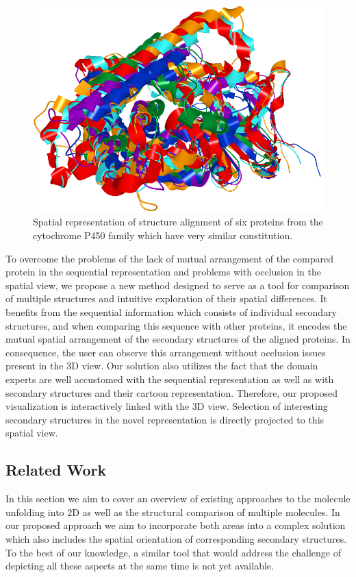 \documentclass[twocolumn]{bmcart}%
\begin{document}
\begin{figure}[h!]
  \centering
  \includegraphics[width=0.9\columnwidth]{pics/many.png}
  \caption{Spatial representation of structure alignment of six proteins from the cytochrome P450 family which have very similar constitution.}
  \label{fig:many}
\end{figure}

To overcome the problems of the lack of mutual arrangement of the compared protein in the sequential representation and problems with occlusion in the spatial view, we propose a new method designed to serve as a tool for comparison of multiple structures and intuitive exploration of their spatial differences.
It benefits from the sequential information which consists of individual secondary structures, and when comparing this sequence with other proteins, it encodes the mutual spatial arrangement of the secondary structures of the aligned proteins.
In consequence, the user can observe this arrangement without occlusion issues present in the 3D view.
Our solution also utilizes the fact that the domain experts are well accustomed with the sequential representation as well as with secondary structures and their cartoon representation. 
Therefore, our proposed visualization is interactively linked with the 3D view.
Selection of interesting secondary structures in the novel representation is directly projected to this spatial view. 


\subsection*{Related Work}
In this section we aim to cover an overview of existing approaches to the molecule unfolding into 2D as well as the structural comparison of multiple molecules.
In our proposed approach we aim to incorporate both areas into a complex solution which also includes the spatial orientation of corresponding secondary structures.
To the best of our knowledge, a similar tool that would address the challenge of depicting all these aspects at the same time is not yet available. 
\end{document}
